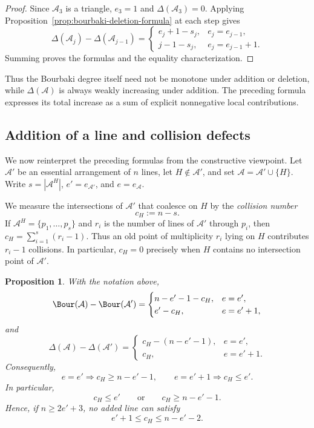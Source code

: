 \documentclass[11pt]{amsart}   %
\newtheorem{Proposition}[Theorem]{Proposition}
\theoremstyle{definition}
\def\A{{\mathcal A}}
\begin{document}
\begin{proof}
Since $\A_3$ is a triangle, $e_3=1$ and $\Delta(\A_3)=0$. Applying Proposition~\ref{prop:bourbaki-deletion-formula} at each step gives
\[
\Delta(\A_j)-\Delta(\A_{j-1})
=
\begin{cases}
e_j+1-s_j,&e_j=e_{j-1},\\
j-1-s_j,&e_j=e_{j-1}+1.
\end{cases}
\]
Summing proves the formulas and the equality characterization.
\end{proof}

Thus the Bourbaki degree itself need not be monotone under addition or deletion, while $\Delta(\A)$ is always weakly increasing under addition. The preceding formula expresses its total increase as a sum of explicit nonnegative local contributions.

\subsection{Addition of a line and collision defects}
\label{subsec:addition-line}

We now reinterpret the preceding formulas from the constructive viewpoint. Let $\A'$ be an essential arrangement of $n$ lines, let $H\notin\A'$, and set $\A=\A'\cup\{H\}$. Write $s=|\A^H|$, $e'=e_{\A'}$, and $e=e_\A$.

We measure the intersections of $\A'$ that coalesce on $H$ by the \emph{collision number}
\[
c_H:=n-s.
\]
If $\A^H=\{p_1,\ldots,p_s\}$ and $r_i$ is the number of lines of $\A'$ through $p_i$, then $c_H=\sum_{i=1}^s(r_i-1)$. Thus an old point of multiplicity $r_i$ lying on $H$ contributes $r_i-1$ collisions. In particular, $c_H=0$ precisely when $H$ contains no intersection point of $\A'$.

\begin{Proposition}
\label{prop:bourbaki-addition-collision}
With the notation above,
\[
\Bour(\A)-\Bour(\A')
=
\begin{cases}
n-e'-1-c_H,&e=e',\\ e'-c_H,&e=e'+1,
\end{cases}
\]
and
\begin{equation}
\label{eq:triangular-defect-addition-collision}
\Delta(\A)-\Delta(\A')
=
\begin{cases}
c_H-(n-e'-1),&e=e',\\
c_H,&e=e'+1.
\end{cases}
\end{equation}
Consequently,
\[
e=e'\Longrightarrow c_H\geq n-e'-1, \qquad e=e'+1\Longrightarrow c_H\leq e'.
\]
In particular,
\[
c_H\leq e'
\qquad\text{or}\qquad
c_H\geq n-e'-1.
\]
Hence, if $n\geq2e'+3$, no added line can satisfy
\[
e'+1\leq c_H\leq n-e'-2.
\]
\end{Proposition}
\end{document}
